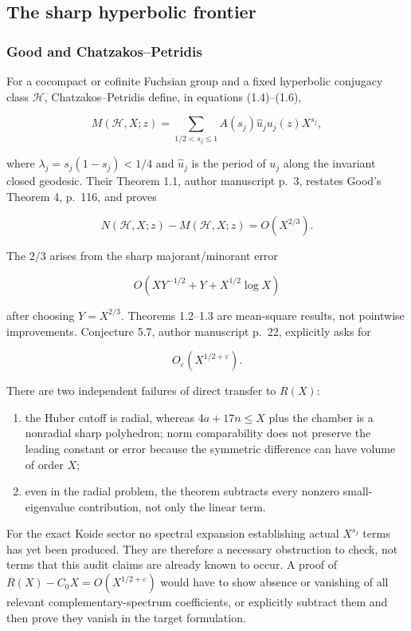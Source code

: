 \subsection{The sharp hyperbolic frontier}\label{koide-lit-the-sharp-hyperbolic-frontier}

\subsubsection{Good and Chatzakos--Petridis}\label{koide-lit-good-and-chatzakospetridis}

For a cocompact or cofinite Fuchsian group and a fixed hyperbolic conjugacy class \(\mathcal H\), Chatzakos--Petridis define, in equations (1.4)--(1.6),

\[
 M(\mathcal H,X;z)
 =\sum_{1/2<s_j\leq1}
 A(s_j)\widehat u_j u_j(z)X^{s_j},
\]

where \(\lambda_j=s_j(1-s_j)<1/4\) and \(\widehat u_j\) is the period of \(u_j\) along the invariant closed geodesic. Their Theorem 1.1, author manuscript p.~3, restates Good's Theorem 4, p.~116, and proves

\[
 N(\mathcal H,X;z)-M(\mathcal H,X;z)=O(X^{2/3}).
\]

The \(2/3\) arises from the sharp majorant/minorant error

\[
 O(XY^{-1/2}+Y+X^{1/2}\log X)
\]

after choosing \(Y=X^{2/3}\). Theorems 1.2--1.3 are mean-square results, not pointwise improvements. Conjecture 5.7, author manuscript p.~22, explicitly asks for

\[
 O_\varepsilon(X^{1/2+\varepsilon}).
\]

There are two independent failures of direct transfer to \(R(X)\):

\begin{enumerate}
\def\labelenumi{\arabic{enumi}.}

\item
  the Huber cutoff is radial, whereas \(4a+17n\leq X\) plus the chamber is a nonradial sharp polyhedron; norm comparability does not preserve the leading constant or error because the symmetric difference can have volume of order \(X\);
\item
  even in the radial problem, the theorem subtracts every nonzero small-eigenvalue contribution, not only the linear term.
\end{enumerate}

For the exact Koide sector no spectral expansion establishing actual \(X^{s_j}\) terms has yet been produced. They are therefore a necessary obstruction to check, not terms that this audit claims are already known to occur. A proof of \(R(X)-C_0X=O(X^{1/2+\varepsilon})\) would have to show absence or vanishing of all relevant complementary-spectrum coefficients, or explicitly subtract them and then prove they vanish in the target formulation.

